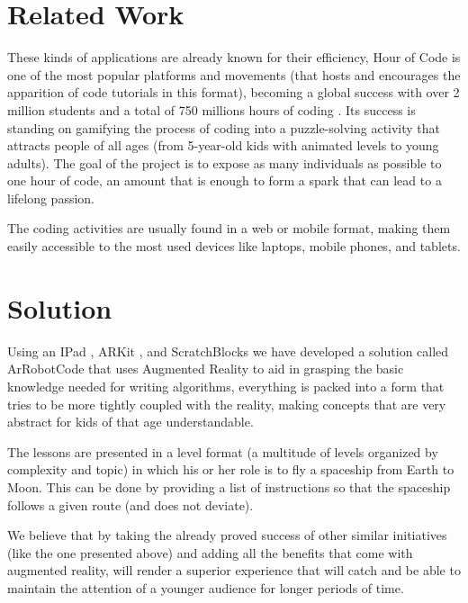 \documentclass[12 pct]{report}
\begin{document}
\section{Related Work}
These kinds of applications are already known for their efficiency, Hour of Code \cite{wilson2014hour} is one of the most popular platforms and movements (that hosts and encourages the apparition of code tutorials in this format), becoming a global success with over 2 million students and a total of 750 millions hours of coding \cite{codeorg} . Its success is standing on gamifying the process of coding into a puzzle-solving activity that attracts people of all ages (from 5-year-old kids with animated levels to young adults). The goal of the project is to expose as many individuals as possible to one hour of code, an amount that is enough to form a spark that can lead to a lifelong passion.

The coding activities are usually found in a web or mobile format, making them easily accessible to the most used devices like laptops, mobile phones, and tablets.

\section{Solution}
Using an IPad \cite{henderson2012ipad}, ARKit \cite{wang2018understanding} , and ScratchBlocks \cite{resnick2009scratch} we have developed a solution called ArRobotCode that uses Augmented Reality to aid in grasping the basic knowledge needed for writing algorithms, everything is packed into a form that tries to be more tightly coupled with the reality, making concepts that are very abstract for kids of that age understandable.

The lessons are presented in a level format (a multitude of levels organized by complexity and topic) in which his or her role is to fly a spaceship from Earth to Moon. This can be done by providing a list of instructions so that the spaceship follows a given route (and does not deviate).

We believe that by taking the already proved success of other similar initiatives (like the one presented above) and adding all the benefits that come with augmented reality, will render a superior experience that will catch and be able to maintain the attention of a younger audience for longer periods of time.
\end{document}
